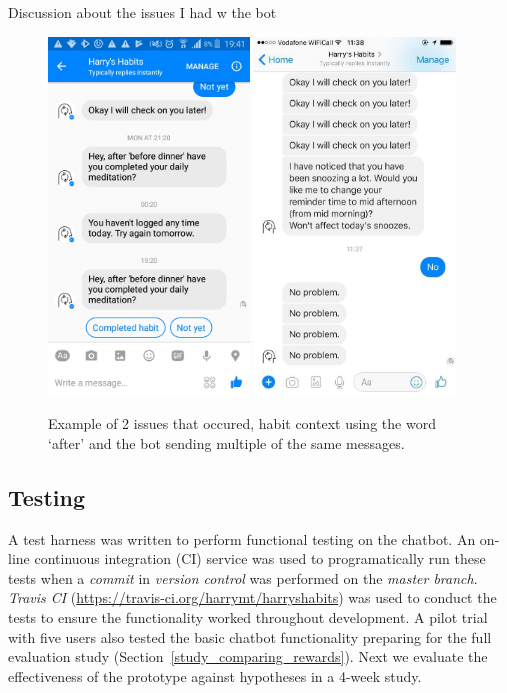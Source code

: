 Discussion about the issues I had w the bot
\begin{figure}[H]
  \centering
  \includegraphics[width=2.1in]{../resources/feedback/after-before.jpg}
  \hspace{10px}
  \includegraphics[width=2.1in]{../resources/feedback/double-messages.jpg}
  \caption{Example of 2 issues that occured, habit context using the word `after' and the bot sending multiple of the same messages.}
  \label{fig:study_bot_issues}
\end{figure}



\subsection{Testing}
A test harness was written to perform functional testing on the chatbot. An on-line continuous integration (CI) service was used to programatically run these tests when a \textit{commit} in \textit{version control} was performed on the \textit{master branch}. \textit{Travis CI} (\url{https://travis-ci.org/harrymt/harryshabits}) was used to conduct the tests to ensure the functionality worked throughout development. A pilot trial with five users also tested the basic chatbot functionality preparing for the full evaluation study (Section~\ref{study_comparing_rewards}). Next we evaluate the effectiveness of the prototype against hypotheses in a 4-week study.

\newpage